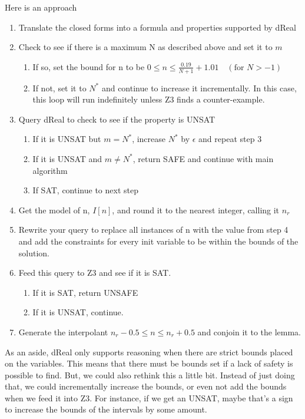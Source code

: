 Here is an approach
\begin{enumerate}
    \item Translate the closed forms into a formula and properties supported by dReal
    \item Check to see if there is a maximum N as described above and set it to $m$
    \begin{enumerate}
        \item If so, set the bound for n to be $0 \leq n \leq \frac{0.19}{N + 1} + 1.01 \quad (\text{for } N > -1)$
        \item If not, set it to $N^*$ and continue to increase it incrementally. In this case, this loop will run indefinitely unless Z3 finds a counter-example.
    \end{enumerate}
    \item Query dReal to check to see if the property is UNSAT
    \begin{enumerate}
        \item If it is UNSAT but $m=N^*$, increase $N^*$ by $\epsilon$ and repeat step 3
        \item If it is UNSAT and $m \not =N^*$, return SAFE and continue with main algorithm
        \item If SAT, continue to next step
    \end{enumerate}
    \item Get the model of n, $I[n]$, and round it to the nearest integer, calling it $n_r$
    \item Rewrite your query to replace all instances of n with the value from step 4 and add the constraints for every init variable to be within the bounds of the solution.
    \item Feed this query to Z3 and see if it is SAT.
    \begin{enumerate}
        \item If it is SAT, return UNSAFE
        \item If it is UNSAT, continue.
    \end{enumerate}
    \item Generate the interpolant $n_r - 0.5 \leq n \leq n_r + 0.5$ and conjoin it to the lemma.
\end{enumerate}

As an aside, dReal only supports reasoning when there are strict bounds placed on the variables. This means that there must be bounds set if a lack of safety is possible to find. But, we could also rethink this a little bit. Instead of just doing that, we could incrementally increase the bounds, or even not add the bounds when we feed it into Z3. For instance, if we get an UNSAT, maybe that's a sign to increase the bounds of the intervals by some amount.

